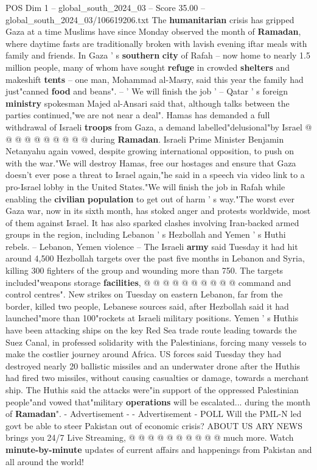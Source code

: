 \begin{textsample}{POS Dim 1 – global\_south\_2024\_03 – Score 35.00 – global\_south\_2024\_03/106619206.txt}
The \textbf{humanitarian} crisis has gripped Gaza at a time Muslims have since Monday observed the month of \textbf{Ramadan}, where daytime fasts are traditionally broken with lavish evening iftar meals with family and friends.
In Gaza ' s \textbf{southern} \textbf{city} of Rafah -- now home to nearly 1.5 million people, many of whom have sought \textbf{refuge} in crowded \textbf{shelters} and makeshift \textbf{tents} -- one man, Mohammad al-Masry, said this year the family had just"canned \textbf{food} and beans". -- ' We will finish the job ' -- Qatar ' s foreign \textbf{ministry} spokesman Majed al-Ansari said that, although talks between the parties continued,"we are not near a deal".
Hamas has demanded a full withdrawal of Israeli \textbf{troops} from Gaza, a demand labelled"delusional"by Israel @ @ @ @ @ @ @ @ @ @ during \textbf{Ramadan}.
Israeli Prime Minister Benjamin Netanyahu again vowed, despite growing international opposition, to push on with the war."We will destroy Hamas, free our hostages and ensure that Gaza doesn't ever pose a threat to Israel again,"he said in a speech via video link to a pro-Israel lobby in the United States."We will finish the job in Rafah while enabling the \textbf{civilian} \textbf{population} to get out of harm ' s way."The worst ever Gaza war, now in its sixth month, has stoked anger and protests worldwide, most of them against Israel.
It has also sparked clashes involving Iran-backed armed groups in the region, including Lebanon ' s Hezbollah and Yemen ' s Huthi rebels. -- Lebanon, Yemen violence -- The Israeli \textbf{army} said Tuesday it had hit around 4,500 Hezbollah targets over the past five months in Lebanon and Syria, killing 300 fighters of the group and wounding more than 750.
The targets included"weapons storage \textbf{facilities}, @ @ @ @ @ @ @ @ @ @ command and control centres".
New strikes on Tuesday on eastern Lebanon, far from the border, killed two people, Lebanese sources said, after Hezbollah said it had launched"more than 100"rockets at Israeli military positions.
Yemen ' s Huthis have been attacking ships on the key Red Sea trade route leading towards the Suez Canal, in professed solidarity with the Palestinians, forcing many vessels to make the costlier journey around Africa.
US forces said Tuesday they had destroyed nearly 20 ballistic missiles and an underwater drone after the Huthis had fired two missiles, without causing casualties or damage, towards a merchant ship.
The Huthis said the attacks were"in support of the oppressed Palestinian people"and vowed that"military \textbf{operations} will be escalated... during the month of \textbf{Ramadan}". - Advertisement - - Advertisement - POLL Will the PML-N led govt be able to steer Pakistan out of economic crisis?
ABOUT US ARY NEWS brings you 24/7 Live Streaming, @ @ @ @ @ @ @ @ @ @ much more.
Watch \textbf{minute-by-minute} updates of current affairs and happenings from Pakistan and all around the world!


\end{textsample}

